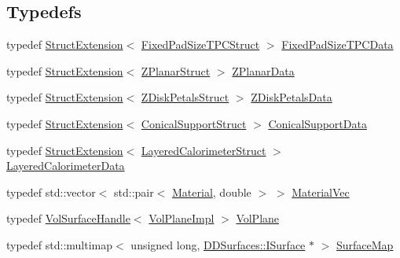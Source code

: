 \subsection*{Typedefs}
\begin{DoxyCompactItemize}
\item 
typedef \hyperlink{struct_d_d4hep_1_1_d_d_rec_1_1_struct_extension}{StructExtension}$<$ \hyperlink{struct_d_d4hep_1_1_d_d_rec_1_1_fixed_pad_size_t_p_c_struct}{FixedPadSizeTPCStruct} $>$ \hyperlink{namespace_d_d4hep_1_1_d_d_rec_a4fe537dc27f78fad18b8182f6f167ca1}{FixedPadSizeTPCData}
\item 
typedef \hyperlink{struct_d_d4hep_1_1_d_d_rec_1_1_struct_extension}{StructExtension}$<$ \hyperlink{struct_d_d4hep_1_1_d_d_rec_1_1_z_planar_struct}{ZPlanarStruct} $>$ \hyperlink{namespace_d_d4hep_1_1_d_d_rec_a33d4dff6a0b5ce47e490b050a3c5f69a}{ZPlanarData}
\item 
typedef \hyperlink{struct_d_d4hep_1_1_d_d_rec_1_1_struct_extension}{StructExtension}$<$ \hyperlink{struct_d_d4hep_1_1_d_d_rec_1_1_z_disk_petals_struct}{ZDiskPetalsStruct} $>$ \hyperlink{namespace_d_d4hep_1_1_d_d_rec_a589fa302569ee79d91b34ff0d97d4a78}{ZDiskPetalsData}
\item 
typedef \hyperlink{struct_d_d4hep_1_1_d_d_rec_1_1_struct_extension}{StructExtension}$<$ \hyperlink{struct_d_d4hep_1_1_d_d_rec_1_1_conical_support_struct}{ConicalSupportStruct} $>$ \hyperlink{namespace_d_d4hep_1_1_d_d_rec_ad032e209cba53400573169b32816f1c9}{ConicalSupportData}
\item 
typedef \hyperlink{struct_d_d4hep_1_1_d_d_rec_1_1_struct_extension}{StructExtension}$<$ \hyperlink{struct_d_d4hep_1_1_d_d_rec_1_1_layered_calorimeter_struct}{LayeredCalorimeterStruct} $>$ \hyperlink{namespace_d_d4hep_1_1_d_d_rec_ab7bf707189c3166efa20740e6f7524b9}{LayeredCalorimeterData}
\item 
typedef std::vector$<$ std::pair$<$ \hyperlink{class_d_d4hep_1_1_geometry_1_1_material}{Material}, double $>$ $>$ \hyperlink{namespace_d_d4hep_1_1_d_d_rec_a69fdab2f851316d2b9e50956920359f7}{MaterialVec}
\item 
typedef \hyperlink{class_d_d4hep_1_1_d_d_rec_1_1_vol_surface_handle}{VolSurfaceHandle}$<$ \hyperlink{class_d_d4hep_1_1_d_d_rec_1_1_vol_plane_impl}{VolPlaneImpl} $>$ \hyperlink{namespace_d_d4hep_1_1_d_d_rec_a6d192b28d640c45adbaa4d1ae9fb18b9}{VolPlane}
\item 
typedef std::multimap$<$ unsigned long, \hyperlink{class_d_d_surfaces_1_1_i_surface}{DDSurfaces::ISurface} $\ast$ $>$ \hyperlink{namespace_d_d4hep_1_1_d_d_rec_a04db40c967eb23286f472ac1c17931d1}{SurfaceMap}

\end{DoxyCompactItemize}
